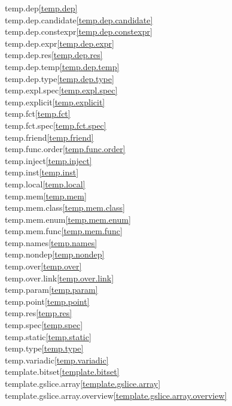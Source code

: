 \begin{multicols}{2}
temp.dep\quad\ref{temp.dep}\\
temp.dep.candidate\quad\ref{temp.dep.candidate}\\
temp.dep.constexpr\quad\ref{temp.dep.constexpr}\\
temp.dep.expr\quad\ref{temp.dep.expr}\\
temp.dep.res\quad\ref{temp.dep.res}\\
temp.dep.temp\quad\ref{temp.dep.temp}\\
temp.dep.type\quad\ref{temp.dep.type}\\
temp.expl.spec\quad\ref{temp.expl.spec}\\
temp.explicit\quad\ref{temp.explicit}\\
temp.fct\quad\ref{temp.fct}\\
temp.fct.spec\quad\ref{temp.fct.spec}\\
temp.friend\quad\ref{temp.friend}\\
temp.func.order\quad\ref{temp.func.order}\\
temp.inject\quad\ref{temp.inject}\\
temp.inst\quad\ref{temp.inst}\\
temp.local\quad\ref{temp.local}\\
temp.mem\quad\ref{temp.mem}\\
temp.mem.class\quad\ref{temp.mem.class}\\
temp.mem.enum\quad\ref{temp.mem.enum}\\
temp.mem.func\quad\ref{temp.mem.func}\\
temp.names\quad\ref{temp.names}\\
temp.nondep\quad\ref{temp.nondep}\\
temp.over\quad\ref{temp.over}\\
temp.over.link\quad\ref{temp.over.link}\\
temp.param\quad\ref{temp.param}\\
temp.point\quad\ref{temp.point}\\
temp.res\quad\ref{temp.res}\\
temp.spec\quad\ref{temp.spec}\\
temp.static\quad\ref{temp.static}\\
temp.type\quad\ref{temp.type}\\
temp.variadic\quad\ref{temp.variadic}\\
template.bitset\quad\ref{template.bitset}\\
template.gslice.array\quad\ref{template.gslice.array}\\
template.gslice.array.overview\quad\ref{template.gslice.array.overview}\\

\end{multicols}

